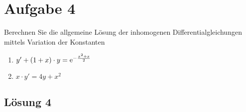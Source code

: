 \documentclass[main.tex]{subfiles}
\begin{document}
\section{Aufgabe 4}
Berechnen Sie die allgemeine Lösung der inhomogenen Differentialgleichungen mittels Variation der Konstanten
\begin{enumerate}
    \item $y' + (1 + x) \cdot y = \mathrm{e}^{-\frac{x^2+x}{2}}$
    \item $x \cdot y' = 4y + x^2$
\end{enumerate}

\subsection{Lösung 4}
\end{document}
